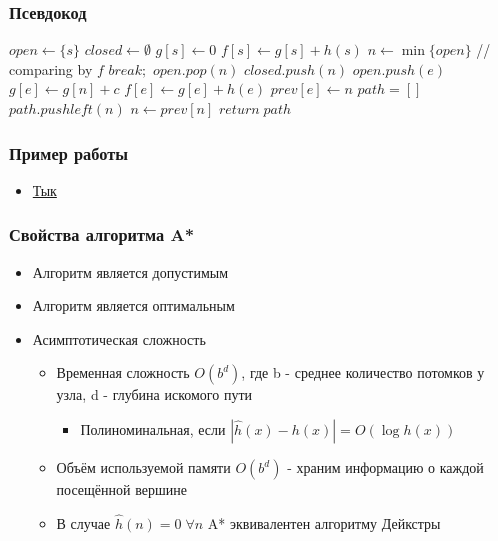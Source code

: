 \documentclass{style}
\begin{document}
\begin{frame}[fragile]
    \frametitle{Псевдокод}
    \begin{tiny}
        \begin{algorithmic}[1]
            \State $open \leftarrow \{s\}$
            \State $closed \leftarrow \emptyset$
            \State $g[s] \leftarrow 0$
            \State $f[s] \leftarrow g[s] + h(s)$
                \State $n \leftarrow \min\{open\}$ // comparing by $f$
                    \State $break;$
                \EndIf
                \State $open.pop(n)$
                \State $closed.push(n)$
                        \State $open.push(e)$
                        \State $g[e] \leftarrow g[n] + c$
                        \State $f[e] \leftarrow g[e] + h(e)$
                        \State $prev[e] \leftarrow n$
                    \EndIf
                \EndFor
            \EndWhile
            \State $path = []$ 
                \State $path.pushleft(n)$
                \State $n \leftarrow prev[n]$
            \EndWhile
            \State $return \; path$
        \EndProcedure
        \end{algorithmic}
    \end{tiny}
\end{frame}

\begin{frame}
    \frametitle{Пример работы}
    \begin{itemize}
        \item \href{https://frolov.icu/astar/example}{Тык}
    \end{itemize}
\end{frame}

\begin{frame}
    \frametitle{Свойства алгоритма A*}
    \begin{itemize}
        \item Алгоритм является допустимым
        \item Алгоритм является оптимальным
        \item Асимптотическая сложность
        \begin{itemize}
            \item Временная сложность $O(b^d)$, где b - среднее количество потомков у узла, d - глубина искомого пути
            \begin{itemize}
                \item Полиноминальная, если $|\hat{h}(x) - h(x)| = O(\log h(x))$
            \end{itemize}
            \item Объём используемой памяти $O(b^d)$ - храним информацию о каждой посещённой вершине
        \item В случае $\hat{h}(n) = 0 \; \forall n$ A* эквивалентен алгоритму Дейкстры
        \end{itemize}
    \end{itemize}
\end{frame}
\end{document}
